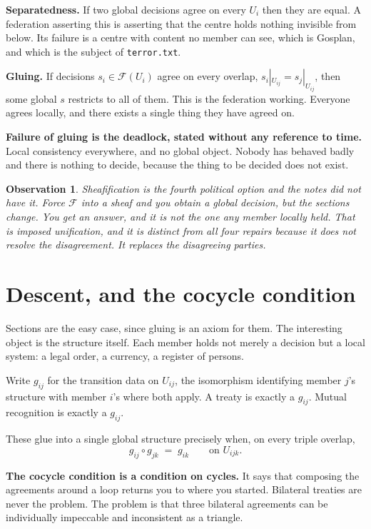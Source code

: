 \documentclass[11pt,a4paper]{article}
\newtheorem*{obs}{Observation}
\begin{document}
\textbf{Separatedness.} If two global decisions agree on every $U_i$ then they are
equal. A federation asserting this is asserting that the centre holds nothing
invisible from below. Its failure is a centre with content no member can see, which
is Gosplan, and which is the subject of \texttt{terror.txt}.

\textbf{Gluing.} If decisions $s_i \in \mathcal{F}(U_i)$ agree on every overlap,
$s_i|_{U_{ij}} = s_j|_{U_{ij}}$, then some global $s$ restricts to all of them.
This is the federation working. Everyone agrees locally, and there exists a
single thing they have agreed on.

\textbf{Failure of gluing is the deadlock, stated without any reference to time.}
Local consistency everywhere, and no global object. Nobody has behaved badly and
there is nothing to decide, because the thing to be decided does not exist.

\begin{obs}
Sheafification is the fourth political option and the notes did not have it. Force
$\mathcal{F}$ into a sheaf and you obtain a global decision, but the sections
change. You get an answer, and it is not the one any member locally held. That is
imposed unification, and it is distinct from all four repairs because it does not
resolve the disagreement. It replaces the disagreeing parties.
\end{obs}

\section{Descent, and the cocycle condition}

Sections are the easy case, since gluing is an axiom for them. The interesting
object is the structure itself. Each member holds not merely a decision but a local
system: a legal order, a currency, a register of persons.

Write $g_{ij}$ for the transition data on $U_{ij}$, the isomorphism identifying
member $j$'s structure with member $i$'s where both apply. A treaty is exactly a
$g_{ij}$. Mutual recognition is exactly a $g_{ij}$.

These glue into a single global structure precisely when, on every triple overlap,
\[
  g_{ij} \circ g_{jk} \;=\; g_{ik} \qquad \text{on } U_{ijk}.
\]

\begin{sectionbox}
\textbf{The cocycle condition is a condition on cycles.} It says that composing
the agreements around a loop returns you to where you started. Bilateral treaties
are never the problem. The problem is that three bilateral agreements can be
individually impeccable and inconsistent as a triangle.
\end{sectionbox}
\end{document}
